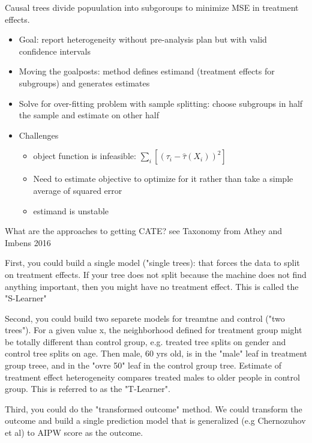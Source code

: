 \documentclass{article}
\begin{document}
Causal trees divide popuulation into subgoroups to minimize MSE in treatment effects.
\begin{itemize}
    \item Goal: report heterogeneity without pre-analysis plan but with valid confidence intervals
    \item Moving the goalposts: method defines estimand (treatment effects for subgroups) and generates estimates
    \item Solve for over-fitting problem with sample splitting: choose subgroups in half the sample and estimate on other half
\end{itemize}

\begin{itemize}
    \item Challenges
    \begin{itemize}
        \item object function is infeasible: $\sum_i [(\tau_i - \hat{\tau}(X_i))^2]$
        \item Need to estimate objective to optimize for it rather than take a simple average of squared error
        \item estimand is unstable
    \end{itemize}
\end{itemize}

What are the approaches to getting CATE? see Taxonomy from Athey and Imbens 2016

First, you could build a single model ("single trees): that forces the data to split on treatment effects. If your tree does not split because the machine does not find anything important, then you might have no treatment effect. This is called the "S-Learner"

Second, you could build two separete models for treamtne and control ("two trees"). For a given value x, the neighborhood defined for treatment group might be totally different than control group, e.g. treated tree splits on gender and control tree splits on age. Then male, 60 yrs old, is in the "male" leaf in treatment group treee, and in the "ovre 50" leaf in the control group tree. Estimate of treatment effect heterogeneity compares treated males to older people in control group. This is referred to as the "T-Learner".

Third, you could do the "transformed outcome" method. We could transform the outcome and build a single prediction model that is generalized (e.g Chernozuhov et al) to AIPW score as the outcome.
\end{document}
